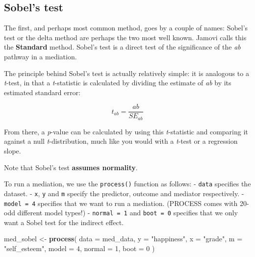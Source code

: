 \documentclass[
]{book}
\newenvironment{Shaded}{\begin{snugshade}}{\end{snugshade}}
\newcommand{\AttributeTok}[1]{\textcolor[rgb]{0.13,0.29,0.53}{#1}}
\newcommand{\DecValTok}[1]{\textcolor[rgb]{0.00,0.00,0.81}{#1}}
\newcommand{\FunctionTok}[1]{\textcolor[rgb]{0.13,0.29,0.53}{\textbf{#1}}}
\newcommand{\NormalTok}[1]{#1}
\newcommand{\OtherTok}[1]{\textcolor[rgb]{0.56,0.35,0.01}{#1}}
\newcommand{\StringTok}[1]{\textcolor[rgb]{0.31,0.60,0.02}{#1}}
\begin{document}
\subsection{Sobel's test}\label{sobels-test}

The first, and perhaps most common method, goes by a couple of names: Sobel's test or the delta method are perhaps the two most well known. Jamovi calls this the \textbf{Standard} method. Sobel's test is a direct test of the significance of the \emph{ab} pathway in a mediation.

The principle behind Sobel's test is actually relatively simple: it is analogous to a \emph{t}-test, in that a \emph{t}-statistic is calculated by dividing the estimate of \emph{ab} by its estimated standard error:

\[
t_{ab} = \frac{ab}{SE_{ab}}
\]

From there, a \emph{p}-value can be calculated by using this \emph{t}-statistic and comparing it against a null \emph{t}-distribution, much like you would with a \emph{t}-test or a regression slope.

Note that Sobel's test \textbf{assumes normality}.

To run a mediation, we use the \texttt{process()} function as follows:
- \texttt{data} specifies the dataset.
- \texttt{x}, \texttt{y} and \texttt{m} specify the predictor, outcome and mediator respectively.
- \texttt{model\ =\ 4} specifies that we want to run a mediation. (PROCESS comes with 20-odd different model types!)
- \texttt{normal\ =\ 1} and \texttt{boot\ =\ 0} specifies that we only want a Sobel test for the indirect effect.

\begin{Shaded}
\begin{Highlighting}[]
\NormalTok{med\_sobel }\OtherTok{\textless{}{-}} \FunctionTok{process}\NormalTok{(}
  \AttributeTok{data =}\NormalTok{ med\_data,}
  \AttributeTok{y =} \StringTok{"happiness"}\NormalTok{,}
  \AttributeTok{x =} \StringTok{"grade"}\NormalTok{,}
  \AttributeTok{m =} \StringTok{"self\_esteem"}\NormalTok{,}
  \AttributeTok{model =} \DecValTok{4}\NormalTok{,}
  \AttributeTok{normal =} \DecValTok{1}\NormalTok{,}
  \AttributeTok{boot =} \DecValTok{0}
\NormalTok{)}
\end{Highlighting}
\end{Shaded}
\end{document}
